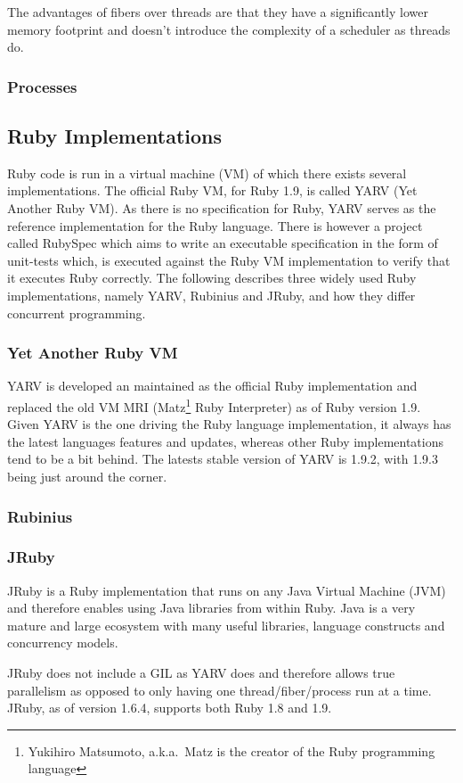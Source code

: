 The advantages of fibers over threads are that they have a significantly lower
memory footprint and doesn't introduce the complexity of a scheduler as
threads do.


\subsubsection{Processes}


\subsection{Ruby Implementations}
Ruby code is run in a virtual machine (VM) of which there exists several
implementations. The official Ruby VM, for Ruby 1.9, is called YARV (Yet 
Another Ruby VM). As there is no specification for Ruby, YARV serves as
the reference implementation for the Ruby language.  There is however a
project called RubySpec which aims to write an executable specification in the
form of unit-tests which, is executed against the Ruby VM implementation to
verify that it executes Ruby correctly. The following describes three widely
used Ruby implementations, namely YARV, Rubinius and JRuby, and how they
differ concurrent programming.

\subsubsection{Yet Another Ruby VM}
YARV is developed an maintained as the official Ruby implementation and replaced
the old VM MRI (Matz\footnote{Yukihiro Matsumoto, a.k.a.\ Matz is the creator of 
the Ruby programming language} Ruby Interpreter) as of Ruby version 1.9. Given
YARV is the one driving the Ruby language implementation, it always has the
latest languages features and updates, whereas other Ruby implementations tend
to be a bit behind. The latests stable version of YARV is 1.9.2, with 1.9.3
being just around the corner.

\subsubsection{Rubinius}

\subsubsection{JRuby}
JRuby is a Ruby implementation that runs on any Java Virtual Machine (JVM)
and therefore enables using Java libraries from within Ruby. Java is a very
mature and large ecosystem with many useful libraries, language constructs and
concurrency models.

JRuby does not include a GIL as YARV does and therefore allows true
parallelism as opposed to only having one thread/fiber/process run at a time.
JRuby, as of version 1.6.4, supports both Ruby 1.8 and 1.9.


